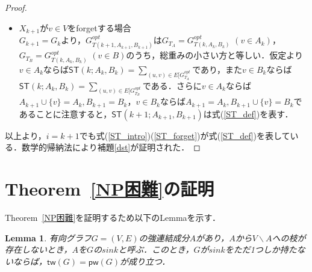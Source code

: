\documentclass[master]{kuisthesis}		%
\theoremstyle{plain}
\newtheorem{lemma}{Lemma}
\theoremstyle{definition}
\begin{document}
{\begin{proof}
\begin{itemize}
        \item $X_{k+1}$が$v \in V$をforgetする場合 \\
        $G_{k+1} = G_k$より，$G^{opt}_{T(k+1, A_{k+1}, B_{k+1})}$は$G_{T_A} = G^{opt}_{T(k, A_k, B_k)}$ $(v \in A_k)$，$G_{T_B} = G^{opt}_{T(k, A_k, B_k)}$ $(v \in B)$のうち，総重みの小さい方と等しい．仮定より$v \in A_k$ならば$\mathsf{ST}(k; A_k, B_k) = \sum_{(u, v) \in E[G^{opt}_{T_A}}$であり，また$v \in B_k$ならば$\mathsf{ST}(k; A_k, B_k) = \sum_{(u, v) \in E[G^{opt}_{T_B}}$である．さらに$v \in A_k$ならば$A_{k+1} \cup \{v\} = A_k, B_{k+1} = B_k$，$v \in B_k$ならば$A_{k+1} = A_k, B_{k+1} \cup \{v\} = B_k$であることに注意すると，$\mathsf{ST}(k+1; A_{k+1}, B_{k+1})$は式(\ref{ST_def})を表す．
    \end{itemize}
    以上より，$i = k+1$でも式(\ref{ST_intro})(\ref{ST_forget})が式(\ref{ST_def})を表している．数学的帰納法により補題\ref{dst}が証明された．
\end{proof}














\section{Theorem~\ref{NP困難}の証明}
Theorem~\ref{NP困難}を証明するため以下のLemmaを示す．

\begin{lemma}\label{sink}
    有向グラフ$G=(V, E)$の強連結成分$A$があり，$A$から$V \backslash A$への枝が存在しないとき，$A$を$G$の$sink$と呼ぶ．このとき，$G$が$sink$をただ1つしか持たないならば，$\mathsf{tw}(G) = \mathsf{pw}(G)$が成り立つ．
\end{lemma}


}
\end{document}
